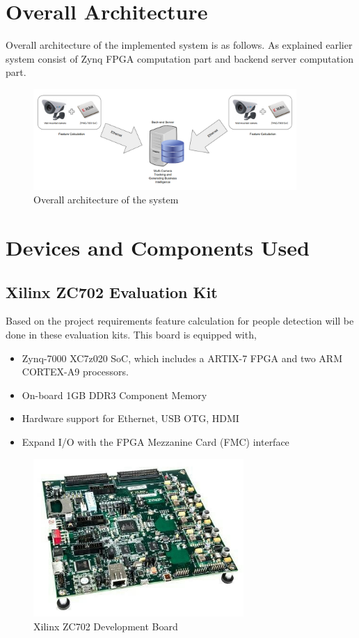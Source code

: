 \documentclass[12pt,a4paper]{report}
\begin{document}
\section{Overall Architecture}
Overall architecture of the implemented system is as follows. As explained earlier system consist of Zynq FPGA computation part and backend server computation part.
\begin{figure}[h]
\includegraphics[width=10cm]{architecture.png}
\centering
\caption{Overall architecture of the system}
\label{f2}
\end{figure}

\section{Devices and Components Used}
\subsection{Xilinx ZC702 Evaluation Kit}
Based on the project requirements feature calculation for people detection will be done in these evaluation kits. This board is equipped with, 
\begin{itemize}
\item Zynq-7000 XC7z020 SoC, which includes a ARTIX-7 FPGA and two ARM CORTEX-A9 processors.
\item On-board 1GB DDR3 Component Memory
\item Hardware support for Ethernet, USB OTG, HDMI
\item Expand I/O with the FPGA Mezzanine Card (FMC) interface 
\end{itemize}
\begin{figure}[H]
\includegraphics[width=8cm]{zc702.jpg}
\centering
\caption{Xilinx ZC702 Development Board}
\label{zc702}
\end{figure}
\end{document}
